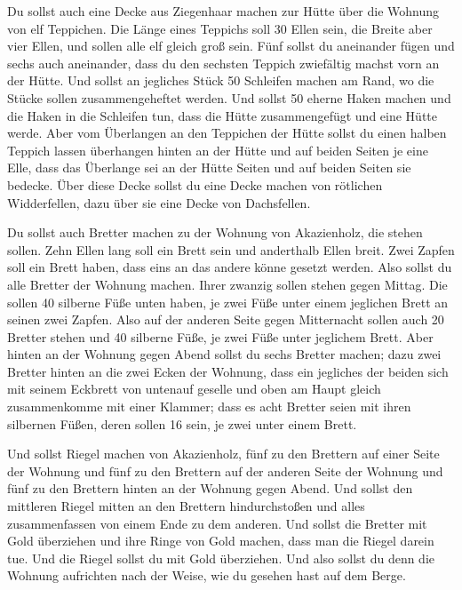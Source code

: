  Du sollst auch eine Decke aus Ziegenhaar machen zur Hütte
über die Wohnung von elf Teppichen.  Die Länge eines
Teppichs soll 30 Ellen sein, die Breite aber vier Ellen, und sollen alle
elf gleich groß sein.  Fünf sollst du aneinander fügen und
sechs auch aneinander, dass du den sechsten Teppich zwiefältig machst
vorn an der Hütte.  Und sollst an jegliches Stück 50
Schleifen machen am Rand, wo die Stücke sollen zusammengeheftet werden.
 Und sollst 50 eherne Haken machen und die Haken in die
Schleifen tun, dass die Hütte zusammengefügt und eine Hütte werde.
 Aber vom Überlangen an den Teppichen der Hütte sollst du
einen halben Teppich lassen überhangen hinten an der Hütte
 und auf beiden Seiten je eine Elle, dass das Überlange
sei an der Hütte Seiten und auf beiden Seiten sie bedecke.
 Über diese Decke sollst du eine Decke machen von
rötlichen Widderfellen, dazu über sie eine Decke von Dachsfellen.

 Du sollst auch Bretter machen zu der Wohnung von
Akazienholz, die stehen sollen.  Zehn Ellen lang soll ein
Brett sein und anderthalb Ellen breit.  Zwei Zapfen soll
ein Brett haben, dass eins an das andere könne gesetzt werden. Also
sollst du alle Bretter der Wohnung machen.  Ihrer zwanzig
sollen stehen gegen Mittag.  Die sollen 40 silberne Füße
unten haben, je zwei Füße unter einem jeglichen Brett an seinen zwei
Zapfen.  Also auf der anderen Seite gegen Mitternacht
sollen auch 20 Bretter stehen  und 40 silberne Füße, je
zwei Füße unter jeglichem Brett.  Aber hinten an der
Wohnung gegen Abend sollst du sechs Bretter machen;  dazu
zwei Bretter hinten an die zwei Ecken der Wohnung,  dass
ein jegliches der beiden sich mit seinem Eckbrett von untenauf geselle
und oben am Haupt gleich zusammenkomme mit einer Klammer;
 dass es acht Bretter seien mit ihren silbernen Füßen,
deren sollen 16 sein, je zwei unter einem Brett.

 Und sollst Riegel machen von Akazienholz, fünf zu den
Brettern auf einer Seite der Wohnung  und fünf zu den
Brettern auf der anderen Seite der Wohnung und fünf zu den Brettern
hinten an der Wohnung gegen Abend.  Und sollst den
mittleren Riegel mitten an den Brettern hindurchstoßen und alles
zusammenfassen von einem Ende zu dem anderen.  Und sollst
die Bretter mit Gold überziehen und ihre Ringe von Gold machen, dass man
die Riegel darein tue.  Und die Riegel sollst du mit Gold
überziehen. Und also sollst du denn die Wohnung aufrichten nach der
Weise, wie du gesehen hast auf dem Berge.

